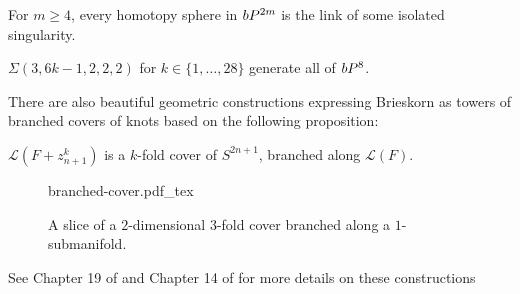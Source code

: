 \begin{theorem}[Brieskorn]
	For $m\geq 4$, every homotopy sphere in $bP^{2m}$ is the link of some isolated singularity.
\end{theorem}

\begin{example}
	$\Sigma(3,6k-1, 2,2,2)$ for $k\in \{1,\ldots,28\}$ generate all of $bP^{8}$.
\end{example}

There are also beautiful geometric constructions expressing Brieskorn as towers of branched covers of knots based on the following proposition:

\begin{proposition}
	$\mathcal{L}(F+z_{n+1}^k)$ is a $k$-fold cover of $S^{2n+1}$, branched along $\mathcal{L}(F)$.
\end{proposition}

\begin{figure}[H]
	\centering
	{branched-cover.pdf_tex}
	\caption{A slice of a $2$-dimensional $3$-fold cover branched along a $1$-submanifold.}
\end{figure}

See Chapter 19 of \cite{kauffman1987knots} and Chapter 14 of \cite{baadhio1996quantum} for more details on these constructions
